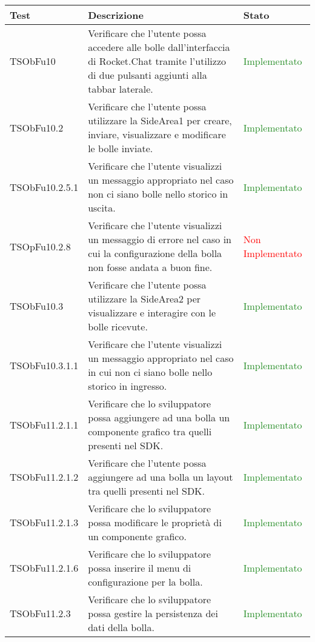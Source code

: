 \begin{center}
\begin{longtable}{|
*{1}{>{\centering\arraybackslash}p{2.8cm}|}
*{1}{>{\centering\arraybackslash}p{6cm}|}
*{1}{>{\centering\arraybackslash}p{3cm}|}}
\hline \textbf{Test} & \textbf{Descrizione} & \textbf{Stato}\\
\hline \endhead

TSObFu10 & Verificare che l'utente possa accedere alle bolle dall'interfaccia di Rocket.Chat tramite l'utilizzo di due pulsanti aggiunti alla tabbar laterale. & \textcolor{ForestGreen}{Implementato}\\
 \hline 
TSObFu10.2 & Verificare che l'utente possa utilizzare la SideArea1 per creare, inviare, visualizzare e modificare le bolle inviate. & \textcolor{ForestGreen}{Implementato}\\
 \hline 
TSObFu10.2.5.1 & Verificare che l'utente visualizzi un messaggio appropriato nel caso non ci siano bolle nello storico in uscita. & \textcolor{ForestGreen}{Implementato}\\
 \hline 
TSOpFu10.2.8 & Verificare che l'utente visualizzi un messaggio di errore nel caso in cui la configurazione della bolla non fosse andata a buon fine. & \textcolor{Red}{Non Implementato}\\
 \hline 
TSObFu10.3 & Verificare che l'utente possa utilizzare la SideArea2 per visualizzare e interagire con le bolle ricevute. & \textcolor{ForestGreen}{Implementato}\\
 \hline 
TSObFu10.3.1.1 & Verificare che l'utente visualizzi un messaggio appropriato nel caso in cui non ci siano bolle nello storico in ingresso. & \textcolor{ForestGreen}{Implementato}\\
 \hline 
TSObFu11.2.1.1 & Verificare che lo sviluppatore possa aggiungere ad una bolla un componente grafico tra quelli presenti nel SDK. & \textcolor{ForestGreen}{Implementato}\\
 \hline 
TSObFu11.2.1.2 & Verificare che l'utente possa aggiungere ad una bolla un layout tra quelli presenti nel SDK. & \textcolor{ForestGreen}{Implementato}\\
 \hline 
TSObFu11.2.1.3 & Verificare che lo sviluppatore possa modificare le proprietà di un componente grafico. & \textcolor{ForestGreen}{Implementato}\\
 \hline 
TSObFu11.2.1.6 & Verificare che lo sviluppatore possa inserire il menu di configurazione per la bolla. & \textcolor{ForestGreen}{Implementato}\\
 \hline 
TSObFu11.2.3 & Verificare che lo sviluppatore possa gestire la persistenza dei dati della bolla. & \textcolor{ForestGreen}{Implementato}\\

\end{longtable}
\end{center}
